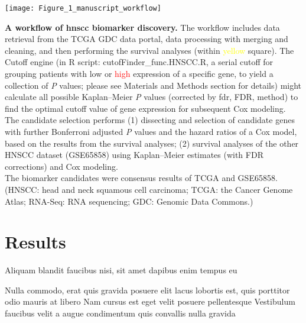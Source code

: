 \documentclass[
paper=landscape,
paper=160mm:90mm, %
fontsize=11pt, %
pagesize, %
parskip=half-, %
]{scrartcl} %
\newcommand{\bcaption}[2]{\caption{\textbf{#1} #2}}
\theoremstyle{mythmstyle} %
\begin{document}
\begin{minipage}[c]{0.8\textwidth}
\centering
\texttt{[image: Figure\_1\_manuscript\_workflow]} %
\bcaption{A workflow of \acrshort{hnscc} biomarker discovery.}
{The workflow includes data retrieval from the TCGA GDC data portal, data processing with merging and cleaning, and then performing the survival analyses (within \textcolor{yellow}{yellow} square). The Cutoff engine (in R script: cutofFinder\_func.HNSCC.R, a serial cutoff for grouping patients with \textcolor{asparagus}{low} or \textcolor{red}{high} expression of a specific gene, to yield a collection of \protect\textit{P} values; please see Materials and Methods section for details) might calculate all possible Kaplan--Meier \protect\textit{P} values (corrected by \acrlong{fdr}, FDR, method) to find the optimal cutoff value of gene expression for subsequent Cox modeling.
The candidate selection performs (1) dissecting and selection of candidate genes with further Bonferroni adjusted \protect\textit{P} values and the hazard ratios of a Cox model, based on the results from the survival analyses;
(2) survival analyses of the other HNSCC dataset (GSE65858) using Kaplan--Meier estimates (with FDR corrections) and Cox modeling.\\
The biomarker candidates were consensus results of TCGA and GSE65858. 
(HNSCC: head and neck squamous cell carcinoma; TCGA: the Cancer Genome Atlas; RNA-Seq: RNA sequencing; GDC: Genomic Data Commons.)}

\end{minipage}

\clearpage

\section{Results}


\begin{outline}

\1 Aliquam blandit faucibus nisi, sit amet dapibus enim tempus eu

\2 Nulla commodo, erat quis gravida posuere
\1 elit lacus lobortis est, quis porttitor odio mauris at libero
\1 Nam cursus est eget velit posuere pellentesque
\1 Vestibulum faucibus velit a augue condimentum quis convallis nulla gravida

\end{outline}
\end{document}
